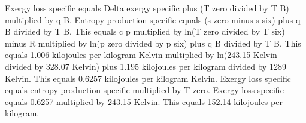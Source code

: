 Exergy loss specific equals Delta exergy specific plus (T zero divided by T B) multiplied by q B.  
Entropy production specific equals (s zero minus s six) plus q B divided by T B.  
This equals c p multiplied by ln(T zero divided by T six) minus R multiplied by ln(p zero divided by p six) plus q B divided by T B.  
This equals 1.006 kilojoules per kilogram Kelvin multiplied by ln(243.15 Kelvin divided by 328.07 Kelvin) plus 1.195 kilojoules per kilogram divided by 1289 Kelvin.  
This equals 0.6257 kilojoules per kilogram Kelvin.  
Exergy loss specific equals entropy production specific multiplied by T zero.  
Exergy loss specific equals 0.6257 multiplied by 243.15 Kelvin.  
This equals 152.14 kilojoules per kilogram.